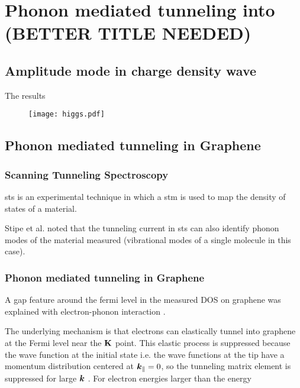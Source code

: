 \documentclass[main.tex]{subfiles}
\begin{document}
\chapter{Phonon mediated tunneling into \TaS (BETTER TITLE NEEDED)}\label{ch:sts_gap_tas2}

\section{Amplitude mode in \TaS charge density wave}

The results 

\begin{figure}[h!]
    \centering
    \texttt{[image: higgs.pdf]}
    \label{}
    \caption{}
\end{figure}


\section{Phonon mediated tunneling in Graphene}

\subsection{Scanning Tunneling Spectroscopy}

\acrfull{sts} is an experimental technique in which a \acrfull{stm} is used to map the density of states of a material.



Stipe et al. noted that the tunneling current in \acrshort{sts} can also identify phonon modes of the material measured \cite{stipe_single-molecule_1998} (vibrational modes of a single molecule in this case).

\subsection{Phonon mediated tunneling in Graphene}

A gap feature around the fermi level in the measured DOS on graphene \cite{zhang_giant_2008} was explained with electron-phonon interaction \cite{wehling_phonon-mediated_2008}.

The underlying mechanism is that electrons can elastically tunnel into graphene at the Fermi level near the \(\vb{K}\) point. 
This elastic process is suppressed because the wave function at the initial state i.e. the wave functions at the tip have a momentum distribution centered at \(\vb*{k}_{\parallel} = 0\), so the tunneling matrix element is suppressed for large \(\vb*{k}\) \cite{vitali_phonon_2004}.
For electron energies larger than the energy 
\end{document}
